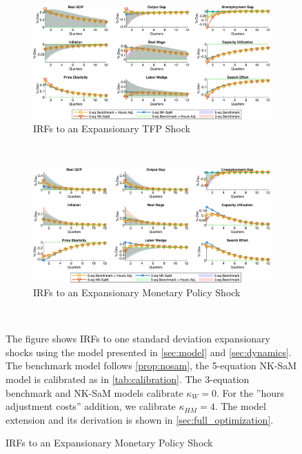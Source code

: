 \documentclass[12pt,3p,authoryear,review]{elsarticle}
\begin{document}
\begin{figure}[h!]%
    \centering%
    \caption{Sticky and Flexible Wages - IRFs to Expansionary TFP and Demand Shocks}\label{fig:app_irf_robust_sw_1}%
    \begin{subfigure}{\textwidth}%
        \centering%
        \caption{IRFs to an Expansionary TFP Shock}%
        \includegraphics[width=\textwidth]{fig_29_irf_robust_stickywage_tfp.png}%
    \end{subfigure}\\%
	\vspace{0.2in}%
    \begin{subfigure}{\textwidth}%
        \centering%
        \caption{IRFs to an Expansionary Monetary Policy Shock}%
        \includegraphics[width=\textwidth]{fig_30_irf_robust_stickywage_policy.png}%
    \end{subfigure}\\%
    {\tiny \singlespacing The figure shows IRFs to one standard deviation expansionary shocks using the model presented in \cref{sec:model} and \cref{sec:dynamics}. The benchmark model follows \cref{prop:nosam}, the 5-equation NK-SaM model is calibrated as in \cref{tab:calibration}. The 3-equation benchmark and NK-SaM models calibrate $\kappa_W=0$. For the ''hours adjustment costs'' addition, we calibrate $\kappa_{HM} = 4$. The model extension and its derivation is shown in \ref{sec:full_optimization}.\par}%
\end{figure}%
\end{document}
